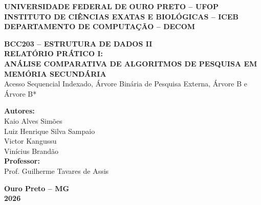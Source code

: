 \documentclass[12pt,a4paper]{article}
\begin{document}
\hypersetup{pageanchor=false}
\begin{titlepage}
    \centering
    {\large \textbf{UNIVERSIDADE FEDERAL DE OURO PRETO -- UFOP}}\\[0.2cm]
    {\large \textbf{INSTITUTO DE CIÊNCIAS EXATAS E BIOLÓGICAS -- ICEB}}\\[0.2cm]
    {\large \textbf{DEPARTAMENTO DE COMPUTAÇÃO -- DECOM}}\\[0.2cm]

    \vfill

    {\large \textbf{BCC203 -- ESTRUTURA DE DADOS II}}\\[0.6cm]

    {\LARGE \textbf{RELATÓRIO PRÁTICO I:}}\\[0.3cm]
    {\Large \textbf{ANÁLISE COMPARATIVA DE ALGORITMOS DE PESQUISA EM MEMÓRIA SECUNDÁRIA}}\\[0.4cm]
    {\large Acesso Sequencial Indexado, Árvore Binária de Pesquisa Externa, Árvore B e Árvore B*}

    \vfill

    {\large \textbf{Autores:}}\\[0.25cm]
    Kaio Alves Simões\\[0.15cm]
    Luiz Henrique Silva Sampaio\\[0.15cm]
    Victor Kangussu\\[0.15cm]
    Vinícius Brandão\\[0.8cm]

    {\large \textbf{Professor:}}\\[0.25cm]
    Prof. Guilherme Tavares de Assis

    \vfill

    {\large \textbf{Ouro Preto -- MG}}\\[0.2cm]
    {\large \textbf{2026}}
\end{titlepage}

\hypersetup{pageanchor=true}
\thispagestyle{empty}
\tableofcontents
\newpage

\setcounter{page}{1}

\end{document}
